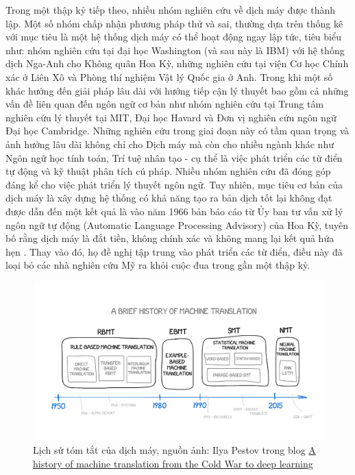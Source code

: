 Trong một thập kỷ tiếp theo, nhiều nhóm nghiên cứu về dịch máy được thành lập. Một số nhóm chấp nhận phương pháp thử và sai, thường dựa trên thống kê với mục tiêu là một hệ thống dịch máy có thể hoạt động ngay lập tức, tiêu biểu như: nhóm nghiên cứu tại đại học Washington (và sau này là IBM) với hệ thống dịch Nga-Anh cho Không quân Hoa Kỳ, những nghiên cứu tại viện Cơ học Chính xác ở Liên Xô và Phòng thí nghiệm Vật lý Quốc gia ở Anh. Trong khi một số khác hướng đến giải pháp lâu dài với hướng tiếp cận lý thuyết bao gồm cả những vấn đề liên quan đến ngôn ngữ cơ bản như nhóm nghiên cứu tại Trung tâm nghiên cứu lý thuyết tại MIT, Đại học Havard và Đơn vị nghiên cứu ngôn ngữ Đại học Cambridge. Những nghiên cứu trong giai đoạn này có tầm quan trọng và ảnh hưởng lâu dài không chỉ cho Dịch máy mà còn cho nhiều ngành khác như Ngôn ngữ học tính toán, Trí tuệ nhân tạo - cụ thể là việc phát triển các từ điển tự động và kỹ thuật phân tích cú pháp. Nhiều nhóm nghiên cứu đã đóng góp đáng kể cho việc phát triển lý thuyết ngôn ngữ. Tuy nhiên, mục tiêu cơ bản của dịch máy là xây dựng hệ thống có khả năng tạo ra bản dịch tốt lại không đạt được dẫn đến một kết quả là vào năm 1966 bản báo cáo từ Ủy ban tư vấn xử lý ngôn ngữ tự động (Automatic Language Processing Advisory) của Hoa Kỳ, tuyên bố rằng dịch máy là đắt tiền, không chính xác và không mang lại kết quả hứa hẹn \cite{hutchins}. Thay vào đó, họ đề nghị tập trung vào phát triển các từ điển, điều này đã loại bỏ các nhà nghiên cứu Mỹ ra khỏi cuộc đua trong gần một thập kỷ.


\begin{figure}
	\centering
	\includegraphics[width=\textwidth]{mthistory}
	\caption[Lịch sử tóm tắt của dịch máy]{Lịch sử tóm tắt của dịch máy, nguồn ảnh: Ilya Pestov trong blog \href{https://medium.freecodecamp.org/a-history-of-machine-translation-from-the-cold-war-to-deep-learning-f1d335ce8b5}{A history of machine translation from the Cold War to deep learning}}
	\label{fig_mthistory}
\end{figure}


